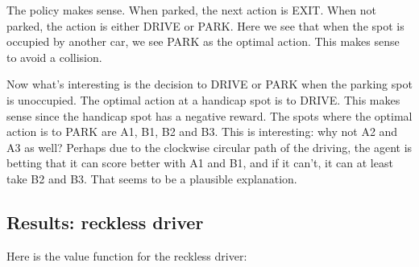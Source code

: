 \documentclass[paper=a4, fontsize=11pt]{scrartcl}
\begin{document}
The policy makes sense. When parked, the next action is EXIT. When not parked, the action is either DRIVE or PARK. Here we see that when the spot is occupied by another car, we see PARK as the optimal action. This makes sense to avoid a collision.

Now what's interesting is the decision to DRIVE or PARK when the parking spot is unoccupied. The optimal action at a handicap spot is to DRIVE. This makes sense since the handicap spot has a negative reward. The spots where the optimal action is to PARK are A1, B1, B2 and B3. This is interesting: why not A2 and A3 as well? Perhaps due to the clockwise circular path of the driving, the agent is betting that it can score better with A1 and B1, and if it can't, it can at least take B2 and B3. That seems to be a plausible explanation.

\subsection{Results: reckless driver}

Here is the value function for the reckless driver:
\end{document}
